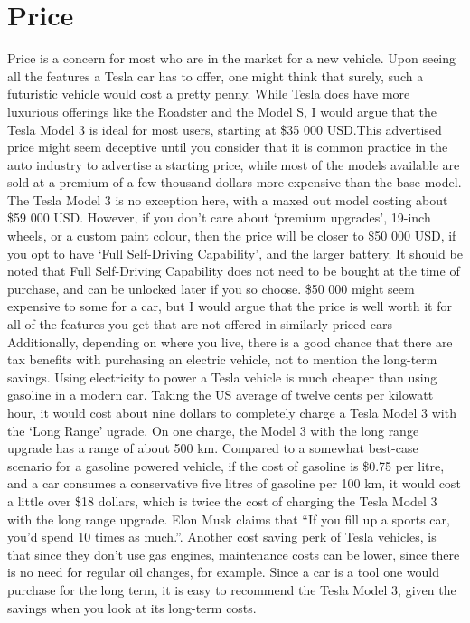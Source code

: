 \documentclass{article}
\begin{document}
  \section{Price}
  Price is a concern for most who are in the market for a new vehicle. Upon seeing
  all the features a Tesla car has to offer, one might think that surely,
  such a futuristic vehicle would cost a pretty penny. While Tesla does have
  more luxurious offerings like the Roadster and the Model S, I would argue that the
  Tesla Model 3 is ideal for most users, starting at \$35 000 USD.\@ This advertised
  price might seem deceptive until you consider that it is common practice
  in the auto industry to advertise a starting price, while most of the models available
  are sold at a premium of a few thousand dollars more expensive than the base model. The
  Tesla Model 3 is no exception here, with a maxed out model costing about
  \$59 000 USD\cite{maxprice}. However, if you don't care about `premium upgrades',
  19-inch wheels, or a custom paint colour, then the price will be closer to
  \$50 000 USD, if you opt to have `Full Self-Driving Capability', and the larger
  battery. It should be noted that Full Self-Driving Capability does not need to be
  bought at the time of purchase, and can be unlocked later if you so choose.
  \$50 000 might seem expensive to some for a car, but I would argue that the price is well worth
  it for all of the features you get that are not offered in similarly priced cars
  Additionally, depending on where you live, there is a good chance that there are
  tax benefits with purchasing an electric vehicle, not to mention the long-term savings.
  Using electricity to power a Tesla vehicle is much cheaper than using gasoline in
  a modern car. Taking the US average of twelve cents per kilowatt hour, it would
  cost about nine dollars to completely charge a Tesla Model 3 with the `Long Range'
  ugrade. On one charge, the Model 3 with the long range upgrade has a range of about
  500 km\cite{500km}. Compared to a somewhat best-case scenario for a gasoline powered vehicle,
  if the cost of gasoline is \$0.75 per litre\cite{75cents}, and a car consumes a conservative five
  litres of gasoline per 100 km\cite{priusmpg}, it would cost a little over \$18 dollars, which is
  twice the cost of charging the Tesla Model 3 with the long range upgrade. Elon Musk claims that
  ``If you fill up a sports car, you'd spend 10 times as much.''\cite{rosoff_elon_nodate}. Another cost
  saving perk of Tesla vehicles, is that since they don't use gas engines, maintenance costs
  can be lower, since there is no need for regular oil changes, for example.\cite{oilchange}
  Since a car is a tool one would purchase for the long term, it is easy to
  recommend the Tesla Model 3, given the savings when you look at its long-term costs.
\end{document}
